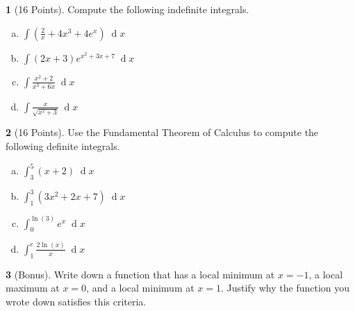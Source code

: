 \documentclass[12pt]{amsart}
\theoremstyle{definition}
\newtheorem{thm}{}
\theoremstyle{definition}
\newcommand{\dx}[1]{\!\!\;\operatorname{d}\!#1}
\begin{document}
\newpage
\begin{thm}[16 Points]
  Compute the following indefinite integrals.
  \begin{enumerate}[(a)]
  \item
    $\displaystyle{\int{\left(\frac{2}{x} + 4x^3 + 4e^x\right)}\dx{x}}$
    \vspace{2in}
  \item
    $\displaystyle{\int(2x + 3)e^{x^2 + 3x + 7}\dx{x}}$
    \vspace{2in}
  \item
    $\displaystyle{\int \frac{x^2 + 2}{x^3 + 6x}\dx{x}}$
    \vspace{2in}
  \item
    $\displaystyle{\int \frac{x}{\sqrt{x^2 + 3}}\dx{x}}$
  \end{enumerate}
\end{thm}
\newpage

\begin{thm}[16 Points]
  Use the Fundamental Theorem of Calculus to compute the following definite integrals.
  \begin{enumerate}[(a)]
  \item
    $\displaystyle{\int_3^5 (x + 2)\dx{x}}$
    \vspace{2in}
  \item
    $\displaystyle{\int_1^3 \left(3x^2 + 2x + 7\right) \dx{x}}$
    \vspace{2in}
  \item
    $\displaystyle{\int_0^{\ln(3)}e^x\dx{x}}$
    \vspace{2in}
  \item
    $\displaystyle{\int_1^e \frac{2\ln(x)}{x}\dx{x}}$
  \end{enumerate}
\end{thm}

\newpage

\begin{thm}[Bonus]
  Write down a function that has a local minimum at $x = -1$, a local maximum at $x = 0$, and a local minimum at $x = 1$.
  Justify why the function you wrote down satisfies this criteria.
\end{thm}
\end{document}

